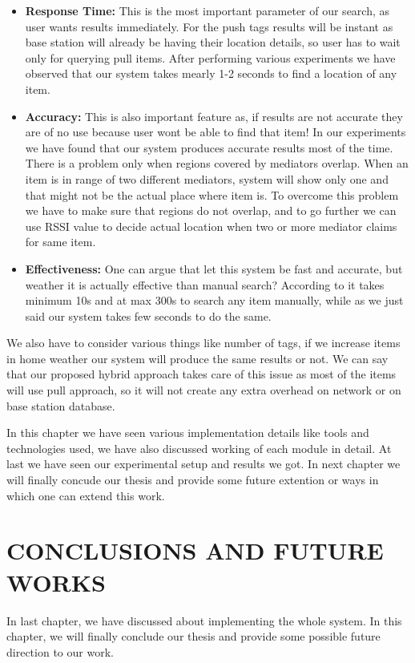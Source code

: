 \documentclass [a4paper,12pt]{book}
\begin{document}
\begin{itemize}
\item \textbf{Response Time:} This is the most important parameter of our search, as user wants results immediately. For the push tags results will be instant as base station will already be having their location details, so user has to wait only for querying pull items. After performing various experiments we have observed that our system takes mearly 1-2 seconds to find a location of any item.
\item \textbf{Accuracy:} This is also important feature as, if results are not accurate they are of no use because user wont be able to find that item! In our experiments we have found that our system produces accurate results most of the time. There is a problem only when regions covered by mediators overlap. When an item is in range of two different mediators, system will show only one and that might not be the actual place where item is. To overcome this problem we have to make sure that regions do not overlap, and to go further we can use RSSI value to decide actual location when two or more mediator claims for same item.
\item \textbf{Effectiveness:} One can argue that let this system be fast and accurate, but weather it is actually effective than manual search? According to \cite{13} it takes minimum 10s and at max 300s to search any item manually, while as we just said our system takes few seconds to do the same.
\end{itemize}

We also have to consider various things like number of tags, if we increase items in home weather our system will produce the same results or not. We can say that our proposed hybrid approach takes care of this issue as most of the items will use pull approach, so it will not create any extra overhead on network or on base station database.

In this chapter we have seen various implementation details like tools and technologies used, we have also discussed working of each module in detail. At last we have seen our experimental setup and results we got. In next chapter we will finally concude our thesis and provide some future extention or ways in which one can extend this work.


\newpage
\chapter{CONCLUSIONS AND FUTURE WORKS}
\vspace{0.2cm}
In last chapter, we have discussed about implementing the whole system. In this chapter, we will finally conclude our thesis and provide some possible future direction to our work.
\end{document}

